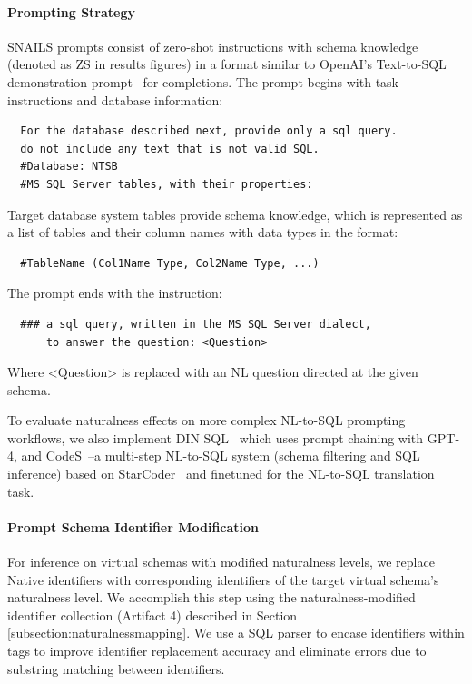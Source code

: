 \paragraph{\textbf{Prompting Strategy}}

SNAILS prompts consist of zero-shot  instructions with schema knowledge (denoted as ZS in results figures) in a format similar to OpenAI's Text-to-SQL demonstration prompt~\cite{gao2023texttosql} for completions. 
The prompt begins with task instructions and database information:

\begin{verbatim}
  For the database described next, provide only a sql query. 
  do not include any text that is not valid SQL.
  #Database: NTSB
  #MS SQL Server tables, with their properties:
\end{verbatim}

Target database system tables provide schema knowledge, which is represented as a list of tables and their column names with data types in the format:

\begin{verbatim}
  #TableName (Col1Name Type, Col2Name Type, ...)
\end{verbatim}

The prompt ends with the instruction:

\begin{verbatim}
  ### a sql query, written in the MS SQL Server dialect, 
      to answer the question: <Question>
\end{verbatim}

Where <Question> is replaced with an NL question directed at the given schema.

To evaluate naturalness effects on more complex NL-to-SQL prompting workflows, we also implement DIN SQL~\cite{pourreza2023dinsql} which uses prompt chaining with GPT-4, and CodeS~\cite{10.1145/3654930}--a multi-step NL-to-SQL system (schema filtering and SQL inference) based on StarCoder~\cite{li2023starcoder} and finetuned for the NL-to-SQL translation task.

\paragraph{\textbf{Prompt Schema Identifier Modification}}
For inference on virtual schemas with modified naturalness levels, we replace Native identifiers with corresponding identifiers of the target virtual schema's naturalness level.
We accomplish this step using the naturalness-modified identifier collection (Artifact 4) described in Section \ref{subsection:naturalnessmapping}.
We use a SQL parser to encase identifiers within tags to improve identifier replacement accuracy and eliminate errors due to substring matching between identifiers.


